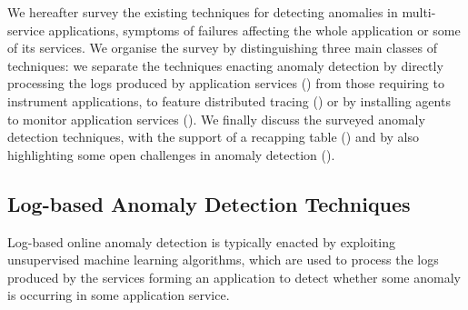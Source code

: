 We hereafter survey the existing techniques for detecting anomalies in multi-service applications, \viz symptoms of failures affecting the whole application or some of its services.
We organise the survey by distinguishing three main classes of techniques:
we separate the techniques enacting anomaly detection by directly processing the logs produced by application services () from those requiring to instrument applications, \viz to feature distributed tracing () or by installing agents to monitor application services ().
We finally discuss the surveyed anomaly detection techniques, with the support of a recapping table () and by also highlighting some open challenges in anomaly detection ().

\subsection{Log-based Anomaly Detection Techniques}
\label{sec:detection:service-logs}

Log-based online anomaly detection is typically enacted by exploiting unsupervised machine learning algorithms, which are used to process the logs produced by the services forming an application to detect whether some anomaly is occurring in some application service.


